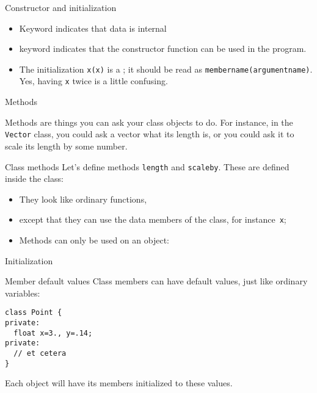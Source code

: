 \begin{block}{Constructor and initialization}
  \begin{itemize}
  \item Keyword  indicates that data is internal
  \item keyword  indicates that the constructor
    function can be used in the program.
  \item The initialization \lstinline{x(x)} is a
    ; it should be read as
    \lstinline{membername(argumentname)}.
    Yes, having \lstinline{x} twice is a little confusing.
  \end{itemize}
\end{block}

\begin{comment}
  Above you had a declaration \lstinline{Vector v} which was not just a
  declaration: it called the so-called \indextermsub{default}{constructor},
  which has no arguments, and does nothing.
\end{comment}

 {Methods}

Methods are things you can ask your class objects to do. For instance,
in the \lstinline{Vector} class, you could ask a vector what its length is,
or you could ask it to scale its length by some number.

\begin{block}{Class methods}
  \label{sl:method-define}
  Let's define methods \lstinline{length} and \lstinline{scaleby}. These are defined inside the
  class:
  \begin{itemize}
  \item They look like ordinary functions,
  \item except that they can use the data members of the class, for
    instance~\lstinline{x};
  \item Methods can only be used on an object:
  \end{itemize}
\end{block}

 {Initialization}

\begin{block}{Member default values}
  \label{sl:class-defval}
  Class members can have default values, just like ordinary variables:
\begin{lstlisting}
class Point {
private:
  float x=3., y=.14;
private:
  // et cetera
}
\end{lstlisting}
  Each object will have its members initialized to these values.
\end{block}

